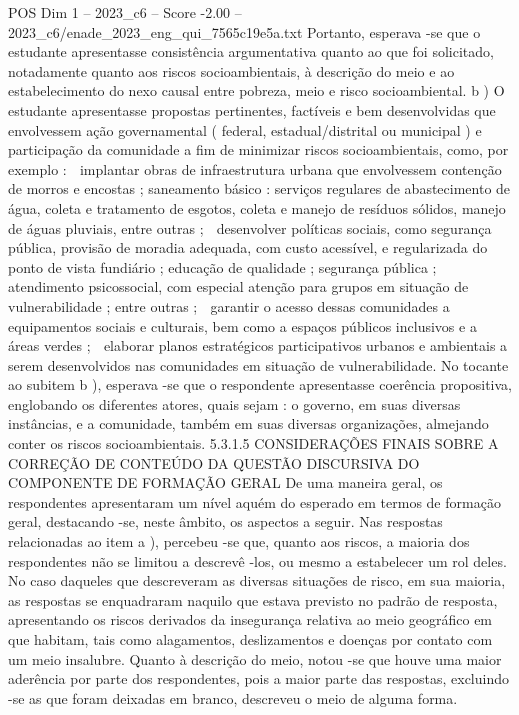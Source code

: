 \begin{textsample}{POS Dim 1 – 2023\_c6 – Score -2.00 – 2023\_c6/enade\_2023\_eng\_qui\_7565c19e5a.txt}
Portanto, esperava -se que o estudante apresentasse consistência argumentativa quanto ao que foi solicitado, notadamente quanto aos riscos socioambientais, à descrição do meio e ao estabelecimento do nexo causal entre pobreza, meio e risco socioambiental. b ) O estudante apresentasse propostas pertinentes, factíveis e bem desenvolvidas que envolvessem ação governamental ( federal, estadual/distrital ou municipal ) e participação da comunidade a fim de minimizar riscos socioambientais, como, por exemplo :  implantar obras de infraestrutura urbana que envolvessem contenção de morros e encostas ; saneamento básico : serviços regulares de abastecimento de água, coleta e tratamento de esgotos, coleta e manejo de resíduos sólidos, manejo de águas pluviais, entre outras ;  desenvolver políticas sociais, como segurança pública, provisão de moradia adequada, com custo acessível, e regularizada do ponto de vista fundiário ; educação de qualidade ; segurança pública ; atendimento psicossocial, com especial atenção para grupos em situação de vulnerabilidade ; entre outras ;  garantir o acesso dessas comunidades a equipamentos sociais e culturais, bem como a espaços públicos inclusivos e a áreas verdes ;  elaborar planos estratégicos participativos urbanos e ambientais a serem desenvolvidos nas comunidades em situação de vulnerabilidade.
No tocante ao subitem b ), esperava -se que o respondente apresentasse coerência propositiva, englobando os diferentes atores, quais sejam : o governo, em suas diversas instâncias, e a comunidade, também em suas diversas organizações, almejando conter os riscos socioambientais. 5.3.1.5 CONSIDERAÇÕES FINAIS SOBRE A CORREÇÃO DE CONTEÚDO DA QUESTÃO DISCURSIVA DO COMPONENTE DE FORMAÇÃO GERAL De uma maneira geral, os respondentes apresentaram um nível aquém do esperado em termos de formação geral, destacando -se, neste âmbito, os aspectos a seguir.
Nas respostas relacionadas ao item a ), percebeu -se que, quanto aos riscos, a maioria dos respondentes não se limitou a descrevê -los, ou mesmo a estabelecer um rol deles.
No caso daqueles que descreveram as diversas situações de risco, em sua maioria, as respostas se enquadraram naquilo que estava previsto no padrão de resposta, apresentando os riscos derivados da insegurança relativa ao meio geográfico em que habitam, tais como alagamentos, deslizamentos e doenças por contato com um meio insalubre.
Quanto à descrição do meio, notou -se que houve uma maior aderência por parte dos respondentes, pois a maior parte das respostas, excluindo -se as que foram deixadas em branco, descreveu o meio de alguma forma.

\end{textsample}
